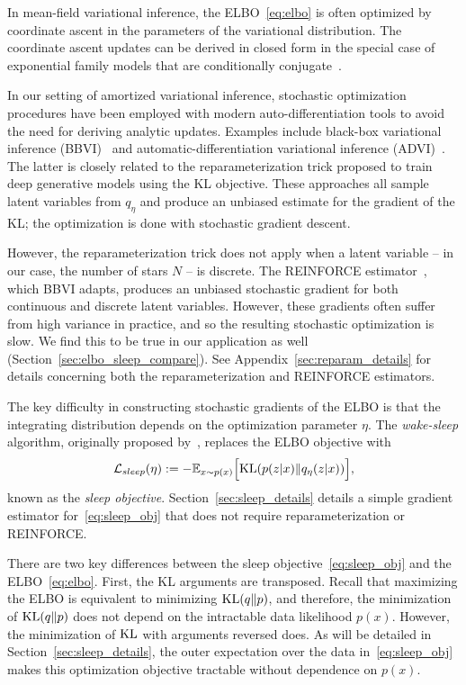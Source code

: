 In mean-field variational inference, the ELBO~\eqref{eq:elbo} is often optimized by coordinate ascent in the parameters of the variational distribution. 
The coordinate ascent updates can be derived in closed form in the special case of exponential family models that are conditionally conjugate~\citep{Blei_2017_vi_review}. 

In our setting of amortized variational inference, stochastic 
optimization procedures have been employed with modern 
auto-differentiation tools to avoid the need for deriving 
analytic updates. Examples include black-box variational inference (BBVI)~\citep{ranganath2013black} 
and automatic-differentiation variational inference (ADVI)~\citep{kucukelbir2016automatic}. The latter 
is closely related to the reparameterization trick \citep{kingma2013autoencoding, rezende2014stochastic} proposed to train deep generative models using the KL objective. 
These approaches all sample latent variables from $q_\eta$ and produce an unbiased estimate 
for the gradient of the KL; the optimization is done with stochastic gradient descent. 

However, the reparameterization trick does not apply when a latent variable -- in our case, the number of stars $N$ -- is discrete. The REINFORCE estimator~\citep{Williams1992reinforce}, which BBVI adapts, produces an unbiased stochastic gradient for both continuous and discrete latent variables.
However, these gradients often suffer from high variance in practice, and so the resulting stochastic optimization is slow. We find this to be true in our application as well (Section~\ref{sec:elbo_sleep_compare}). 
See Appendix~\ref{sec:reparam_details} for details concerning both the reparameterization and REINFORCE estimators. 

The key difficulty in constructing stochastic gradients of the ELBO is that the integrating distribution depends on the optimization parameter $\eta$. 
The {\itshape wake-sleep} algorithm, originally proposed by~\cite{Hinton1995wake_sleep}, replaces the 
ELBO objective with 
\begin{align}
    \mathcal{L}_{sleep}(\eta) := 
    - \mathbb{E}_{x \sim p(x)}\Big[\textrm{KL}(p(z | x) \| q_\eta(z | x))\Big]
    \label{eq:sleep_obj},
\end{align}
known as the {\itshape sleep objective}.  Section~\ref{sec:sleep_details} details a simple gradient estimator for~\eqref{eq:sleep_obj} that does not require reparameterization or REINFORCE. 

There are two key differences between the sleep objective~\eqref{eq:sleep_obj} and the ELBO~\eqref{eq:elbo}. 
First, the KL arguments are transposed. 
Recall that maximizing the ELBO is equivalent to minimizing
$\textrm{KL}(q\|p)$, and 
therefore, the minimization of $\textrm{KL}(q\|p)$ does not depend on the intractable data likelihood $p(x)$. 
However, the minimization of $\textrm{KL}$ with arguments reversed does. 
As will be detailed in Section~\ref{sec:sleep_details}, the outer expectation over the data in~\eqref{eq:sleep_obj} makes this optimization objective tractable without dependence on $p(x)$. 


